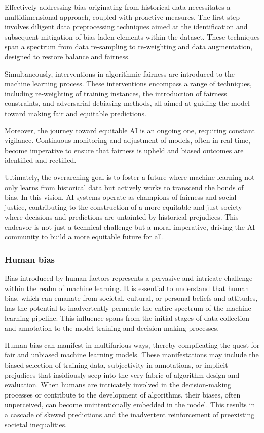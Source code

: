 \documentclass[12pt,a4paper,openright,twoside]{book}
\begin{document}
Effectively addressing bias originating from historical data necessitates a multidimensional approach, coupled with proactive measures. The first step involves diligent data preprocessing techniques aimed at the identification and subsequent mitigation of bias-laden elements within the dataset. These techniques span a spectrum from data re-sampling to re-weighting and data augmentation, designed to restore balance and fairness. 

Simultaneously, interventions in algorithmic fairness are introduced to the machine learning process. These interventions encompass a range of techniques, including re-weighting of training instances, the introduction of fairness constraints, and adversarial debiasing methods, all aimed at guiding the model toward making fair and equitable predictions. 

Moreover, the journey toward equitable AI is an ongoing one, requiring constant vigilance. Continuous monitoring and adjustment of models, often in real-time, become imperative to ensure that fairness is upheld and biased outcomes are identified and rectified. 

Ultimately, the overarching goal is to foster a future where machine learning not only learns from historical data but actively works to transcend the bonds of bias. In this vision, AI systems operate as champions of fairness and social justice, contributing to the construction of a more equitable and just society where decisions and predictions are untainted by historical prejudices. This endeavor is not just a technical challenge but a moral imperative, driving the AI community to build a more equitable future for all.

\subsubsection{Human bias}

Bias introduced by human factors represents a pervasive and intricate challenge within the realm of machine learning. It is essential to understand that human bias, which can emanate from societal, cultural, or personal beliefs and attitudes, has the potential to inadvertently permeate the entire spectrum of the machine learning pipeline. This influence spans from the initial stages of data collection and annotation to the model training and decision-making processes. 

Human bias can manifest in multifarious ways, thereby complicating the quest for fair and unbiased machine learning models. These manifestations may include the biased selection of training data, subjectivity in annotations, or implicit prejudices that insidiously seep into the very fabric of algorithm design and evaluation. When humans are intricately involved in the decision-making processes or contribute to the development of algorithms, their biases, often unperceived, can become unintentionally embedded in the model. This results in a cascade of skewed predictions and the inadvertent reinforcement of preexisting societal inequalities. \cite{https://doi.org/10.1002/widm.1356} 
\end{document}
